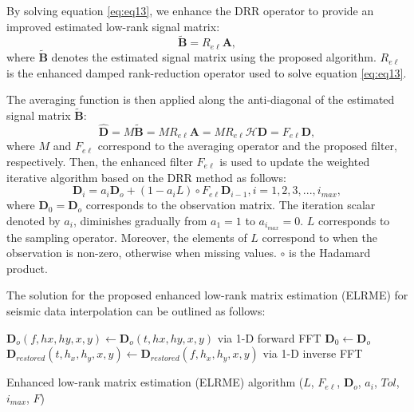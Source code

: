 By solving equation \ref{eq:eq13}, we enhance the DRR operator to provide an improved estimated low-rank signal matrix: 	 
\begin{equation}
\mathbf{\tilde{B}}={R}_{e\ell}{\mathbf{{A}}}, 
\label{eq:eq16}
\end{equation}
where $\mathbf{\tilde{B}}$ denotes the estimated signal matrix using the proposed algorithm. ${R}_{e\ell}$ is the enhanced damped rank-reduction operator used to solve equation \ref{eq:eq13}.

The averaging function is then applied along the anti-diagonal of the estimated signal matrix $\mathbf{\tilde{B}}$:
\begin{equation}
\mathbf{\hat{D}}={M}\mathbf{\tilde{B}}={M}{R_{e\ell}}\mathbf{A}={M}{{R_{e\ell}}}\mathbf{{\mathcal{H}}\mathbf{D}}={F}_{e\ell}\mathbf{{D}},
\label{eq:eq17}
\end{equation}
where ${M}$ and ${F}_{e\ell}$ correspond to the averaging operator and the proposed filter, respectively.
\label{eq:eq18}
Then, the enhanced filter ${F}_{e\ell}$ is used to update the weighted iterative algorithm based on the DRR method as follows: 
\begin{equation}
\mathbf{D}_i= a_{i}\mathbf{D}_o + (1 - a_{i}{L})\circ{F}_{e\ell}\mathbf{D}_{i - 1},  i = 1, 2, 3, . . . , i_{max}, 
\end{equation}
where $\mathbf{D}_0=\mathbf{D}_o$ corresponds to the observation matrix. The iteration scalar denoted by $a_{i}$, diminishes gradually from $a_1=1$ to $a_{i_{max}}=0$. ${L}$ corresponds to the sampling operator. Moreover, the elements of ${L}$ correspond to  when the observation is non-zero, otherwise  when missing values. $\circ$ is the Hadamard product.

The solution for the proposed enhanced low-rank matrix estimation (ELRME) for  seismic data interpolation can be outlined as follows:

\begin{center}
	\begin{algorithm}[H]
		\DontPrintSemicolon
		$\mathbf{D}_o(f, hx, hy, x, y)\leftarrow \mathbf{D}_o(t, hx, hy, x, y)$ via 1-D forward FFT\;    
		$\mathbf{D}_0\leftarrow\mathbf{D}_o$\;
		$\mathbf{D}_{restored}(t,h_{x}, h_{y}, x, y)\leftarrow \mathbf{D}_{restored}(f,h_{x}, h_{y}, x, y)$ via 1-D inverse FFT\;
		
		\caption{Enhanced low-rank matrix estimation (ELRME) algorithm ({${L}$}, {${F}_{e\ell}$}, {$\mathbf{D}_{o}$}, {$a_{i}$}, {$Tol$}, {$i_{max}$}, {${F}$})}
		
	\end{algorithm}
\end{center} 

